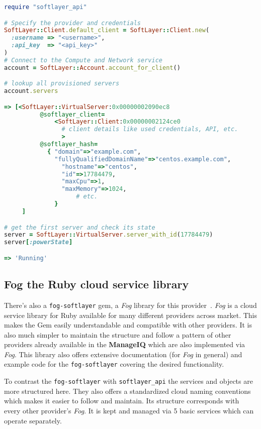 \begin{lstlisting}[language=Ruby,caption={Example code for the \texttt{softlayer\_api}},label=code:softlayer_api,float=htpb]
require "softlayer_api"

# Specify the provider and credentials
SoftLayer::Client.default_client = SoftLayer::Client.new(
  :username => "<username>",
  :api_key  => "<api_key>"
)
# Connect to the Compute and Network service
account = SoftLayer::Account.account_for_client()

# lookup all provisioned servers
account.servers

=> [<SoftLayer::VirtualServer:0x00000002090ec8
		  @softlayer_client=
			  <SoftLayer::Client:0x00000002124ce0
				# client details like used credentials, API, etc.
				>
		  @softlayer_hash=
		   	{ "domain"=>"example.com",
		      "fullyQualifiedDomainName"=>"centos.example.com",
		    	"hostname"=>"centos",
		    	"id"=>17784479,
		    	"maxCpu"=>1,
		    	"maxMemory"=>1024,
					# etc.
			  }
	 ]

# get the first server and check its state
server = SoftLayer::VirtualServer.server_with_id(17784479)
server[:powerState]

=> 'Running'
\end{lstlisting}

\subsection{Fog the Ruby cloud service library}
\label{sub:Fog cloud library}

There's also a \texttt{fog-softlayer} gem, a \emph{Fog} library for this provider~\cite{fog-softlayer}. \emph{Fog} is a cloud service library for Ruby available for many different providers across market. This makes the Gem easily understandable and compatible with other providers. It is also much simpler to maintain the structure and follow a pattern of other providers already available in the \textbf{ManageIQ} which are also implemented via \emph{Fog}. This library also offers extensive documentation (for \emph{Fog} in general) and example code for the \texttt{fog-softlayer} covering the desired functionality.

To contrast the \texttt{fog-softlayer} with \texttt{softlayer\_api} the services and objects are more structured here. They also offers a standardized cloud naming conventions which makes it easier to follow and maintain. Its structure corresponds with every other provider's \emph{Fog}. It is kept and managed via 5 basic services which can operate separately.

